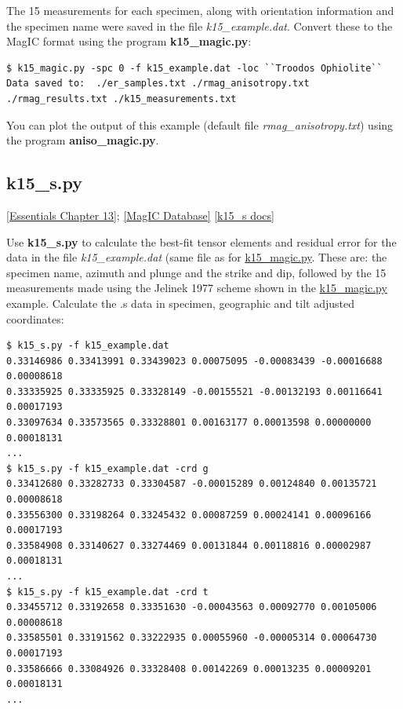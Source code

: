 \documentclass[11pt]{book}
\begin{document}
{{  The 15 measurements for each specimen, along with orientation information and the specimen name were saved in the file {\it k15\_example.dat}.    Convert these to the MagIC format using the program {\bf k15\_magic.py}:

\begin{verbatim}
$ k15_magic.py -spc 0 -f k15_example.dat -loc ``Troodos Ophiolite``
Data saved to:  ./er_samples.txt ./rmag_anisotropy.txt ./rmag_results.txt ./k15_measurements.txt
 \end{verbatim}

You can plot the output of this example (default file {\it rmag\_anisotropy.txt}) using the program {\bf aniso\_magic.py}.

\subsection{k15\_s.py}
\href{http://earthref.org/MAGIC/books/Tauxe/Essentials/WebBook3ch13.html#ch13}{[Essentials Chapter 13]};
\href{#MagICDatabase}{[MagIC Database]}
\href{https://github.com/PmagPy/PmagPy/blob/master/programs/k15_s.py}{[k15\_s docs]}

%
Use {\bf k15\_s.py} to calculate the best-fit tensor elements and residual error for the data in the file {\it k15\_example.dat} (same file as for \href{#k15_magic.py}{k15\_magic.py}.  These are: the specimen name, azimuth and plunge and the strike and dip, followed by the 15 measurements made using the Jelinek 1977 \nocite{jelinek77} scheme shown in the \href{#k15_magic.py}{k15\_magic.py} example.  Calculate the .s data in specimen, geographic  and tilt adjusted coordinates:

\begin{verbatim}
$ k15_s.py -f k15_example.dat
0.33146986 0.33413991 0.33439023 0.00075095 -0.00083439 -0.00016688 0.00008618
0.33335925 0.33335925 0.33328149 -0.00155521 -0.00132193 0.00116641 0.00017193
0.33097634 0.33573565 0.33328801 0.00163177 0.00013598 0.00000000 0.00018131
...
$ k15_s.py -f k15_example.dat -crd g
0.33412680 0.33282733 0.33304587 -0.00015289 0.00124840 0.00135721 0.00008618
0.33556300 0.33198264 0.33245432 0.00087259 0.00024141 0.00096166 0.00017193
0.33584908 0.33140627 0.33274469 0.00131844 0.00118816 0.00002987 0.00018131
...
$ k15_s.py -f k15_example.dat -crd t
0.33455712 0.33192658 0.33351630 -0.00043563 0.00092770 0.00105006 0.00008618
0.33585501 0.33191562 0.33222935 0.00055960 -0.00005314 0.00064730 0.00017193
0.33586666 0.33084926 0.33328408 0.00142269 0.00013235 0.00009201 0.00018131
...
\end{verbatim}

}}
\end{document}
